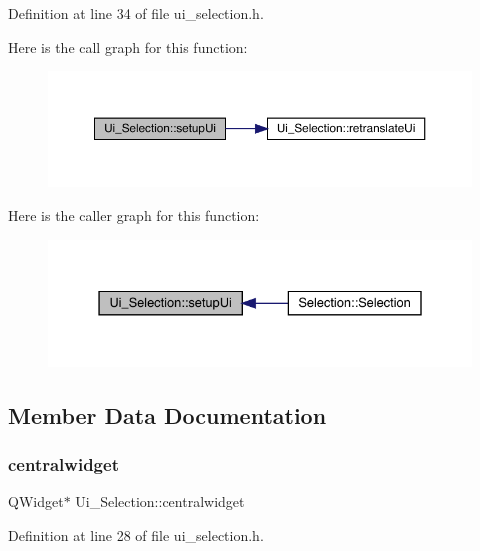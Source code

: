 Definition at line 34 of file ui\+\_\+selection.\+h.

Here is the call graph for this function\+:
\nopagebreak
\begin{figure}[H]
\begin{center}
\leavevmode
\includegraphics[width=350pt]{class_ui___selection_a322e6793d2b12efe827615c705a923a2_cgraph}
\end{center}
\end{figure}
Here is the caller graph for this function\+:
\nopagebreak
\begin{figure}[H]
\begin{center}
\leavevmode
\includegraphics[width=331pt]{class_ui___selection_a322e6793d2b12efe827615c705a923a2_icgraph}
\end{center}
\end{figure}


\subsection{Member Data Documentation}
\mbox{\label{class_ui___selection_a16b39d9bb526b0e91c9164f9662ef359}} 
\subsubsection{\texorpdfstring{centralwidget}{centralwidget}}
{\footnotesize\ttfamily Q\+Widget$\ast$ Ui\+\_\+\+Selection\+::centralwidget}



Definition at line 28 of file ui\+\_\+selection.\+h.

